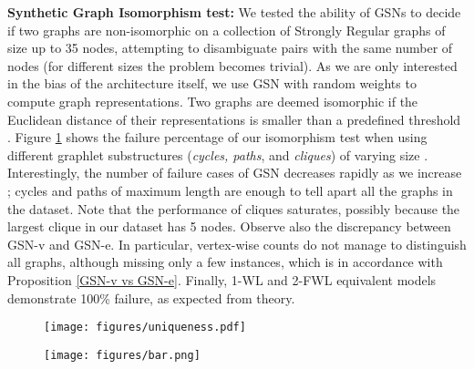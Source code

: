\documentclass{article} \usepackage{iclr2021_conference,times}
\newcommand{\modelname}{GSN}
\begin{document}
\noindent\textbf{Synthetic Graph Isomorphism test:}\label{synthetic}
We tested the ability of GSNs to decide if two graphs are non-isomorphic on a collection of Strongly Regular graphs of size up to 35 nodes,  attempting to disambiguate pairs with the same number of nodes (for different sizes the problem becomes trivial). As we are only interested in the bias of the architecture itself, we use GSN with random weights to compute graph representations. Two graphs are deemed isomorphic if the Euclidean distance of their representations is smaller than a predefined threshold . Figure \ref{fig:sr_plot} shows the failure percentage of our isomorphism test when using different graphlet substructures (\textit{cycles, paths}, and \textit{cliques}) of varying size . Interestingly, the number of failure cases of GSN decreases rapidly as we increase ; cycles and paths of maximum length  are enough to tell apart all the graphs in the dataset. Note that the performance of cliques saturates, possibly because the largest clique in our dataset has 5 nodes. Observe also the discrepancy between \modelname-v and \modelname-e. In particular, vertex-wise counts do not manage to distinguish all graphs, although missing only a few instances, which is in accordance with Proposition \ref{GSN-v vs GSN-e}. Finally, 1-WL \citep{xu2018how} and 2-FWL \citep{maron2019provably} equivalent models demonstrate 100\% failure, as expected from theory.



\begin{figure}[t]
    \begin{minipage}[t]{0.48\linewidth}\vspace{-3mm}
        \centering
          \texttt{[image: figures/uniqueness.pdf]}
           \captionsetup[figure]{skip=\abovecaptionskip}
        \label{fig:zinc-substructures}
    \end{minipage}
    \hfill
    \begin{minipage}[t]{0.48\linewidth}\vspace{-3mm}
        \centering
         \texttt{[image: figures/bar.png]}
         \captionsetup[figure]{skip=\abovecaptionskip}
        \vspace{-3mm}
        \label{fig:sr_plot} 
    \end{minipage}\vspace{-4mm}
\end{figure}
\end{document}

